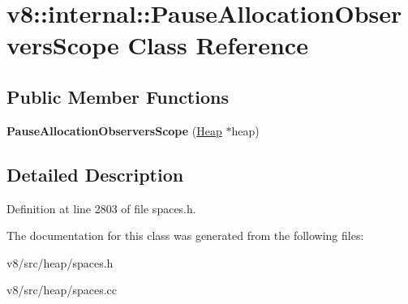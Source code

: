 \hypertarget{classv8_1_1internal_1_1PauseAllocationObserversScope}{}\section{v8\+:\+:internal\+:\+:Pause\+Allocation\+Observers\+Scope Class Reference}
\label{classv8_1_1internal_1_1PauseAllocationObserversScope}
\subsection*{Public Member Functions}
\begin{DoxyCompactItemize}
\item 
\mbox{\label{classv8_1_1internal_1_1PauseAllocationObserversScope_aa86c901cef00d89cf34115ae30700b4d}} 
{\bfseries Pause\+Allocation\+Observers\+Scope} (\mbox{\hyperlink{classv8_1_1internal_1_1Heap}{Heap}} $\ast$heap)
\end{DoxyCompactItemize}


\subsection{Detailed Description}


Definition at line 2803 of file spaces.\+h.



The documentation for this class was generated from the following files\+:\begin{DoxyCompactItemize}
\item 
v8/src/heap/spaces.\+h\item 
v8/src/heap/spaces.\+cc\end{DoxyCompactItemize}
